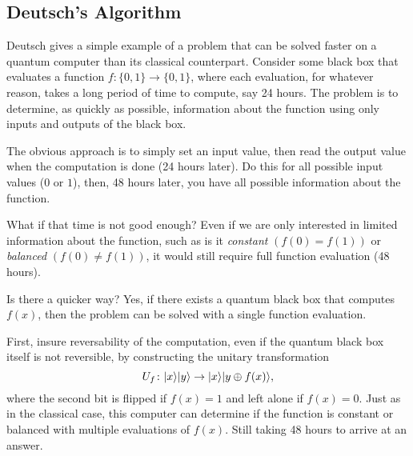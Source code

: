 \subsection{Deutsch's Algorithm}

Deutsch\cite{Deutsch:?} gives a simple example of a problem that
can be solved faster on a quantum computer than its classical
counterpart.
Consider some black box that evaluates a function 
$f\colon\lbrace 0,1\rbrace\to\lbrace 0,1\rbrace$,
where each evaluation, for whatever reason, 
takes a long period of time to compute, say 24 hours.
The problem is to determine, as quickly as possible, 
information about the function
using only inputs and outputs of the black box.

The obvious approach is to simply set an input value,
then read the output value when the computation is done
(24 hours later).  Do this for all possible input values
($0$ or $1$), then, 48 hours later, you have all possible 
information about the function.

What if that time is not good enough?  Even if we are only 
interested in limited information about the function, 
such as is it \emph{constant} $\left( f(0) = f(1) \right)$ or
\emph{balanced} $\left( f(0) \ne f(1) \right)$, it would still
require full function evaluation (48 hours).

Is there a quicker way?  Yes, if there exists a quantum
black box that computes $f(x)$, then the problem can be solved
with a single function evaluation.  

First, insure reversability of the computation, even if the 
quantum black box itself is
not reversible, by constructing the unitary transformation
\begin{equation}
U_f\colon {|{x}\rangle}{|{y}\rangle} \to {|{x}\rangle}{|{y\oplus f(x)}\rangle},
\end{equation}
where the second bit is flipped if $f(x)=1$ and left alone
if $f(x)=0$.
Just as in the classical case, this computer can determine
if the function is constant or balanced with multiple evaluations
of $f(x)$.  Still taking 48 hours to arrive at an answer.

